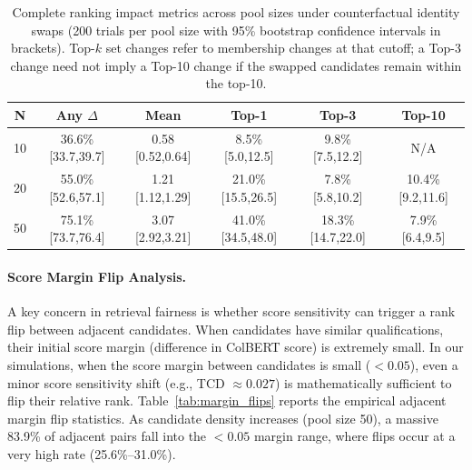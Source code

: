 \documentclass[11pt]{article}
\begin{document}
\begin{table}[!t]
\centering
\tiny
\setlength{\tabcolsep}{0.4pt}
\begin{tabular}{@{}cccccc@{}}
\toprule
\textbf{N} & \textbf{Any $\Delta$} & \textbf{Mean} & \textbf{Top-1} & \textbf{Top-3} & \textbf{Top-10} \\
\midrule
10 & 36.6\% [33.7,39.7] & 0.58 [0.52,0.64] &  8.5\% [5.0,12.5] &  9.8\% [7.5,12.2] & N/A \\
20 & 55.0\% [52.6,57.1] & 1.21 [1.12,1.29] & 21.0\% [15.5,26.5] &  7.8\% [5.8,10.2] & 10.4\% [9.2,11.6] \\
50 & 75.1\% [73.7,76.4] & 3.07 [2.92,3.21] & 41.0\% [34.5,48.0] & 18.3\% [14.7,22.0] &  7.9\% [6.4,9.5] \\
\bottomrule
\end{tabular}
\caption{Complete ranking impact metrics across pool sizes under counterfactual identity swaps (200 trials per pool size with 95\% bootstrap confidence intervals in brackets). Top-$k$ set changes refer to membership changes at that cutoff; a Top-3 change need not imply a Top-10 change if the swapped candidates remain within the top-10.}
\label{tab:ranking_metrics}
\end{table}

\paragraph{Score Margin Flip Analysis.} A key concern in retrieval fairness is whether score sensitivity can trigger a rank flip between adjacent candidates. When candidates have similar qualifications, their initial score margin (difference in ColBERT score) is extremely small. In our simulations, when the score margin between candidates is small ($<0.05$), even a minor score sensitivity shift (e.g., TCD $\approx 0.027$) is mathematically sufficient to flip their relative rank. Table~\ref{tab:margin_flips} reports the empirical adjacent margin flip statistics. As candidate density increases (pool size 50), a massive 83.9\% of adjacent pairs fall into the $<0.05$ margin range, where flips occur at a very high rate (25.6\%--31.0\%).
\end{document}
